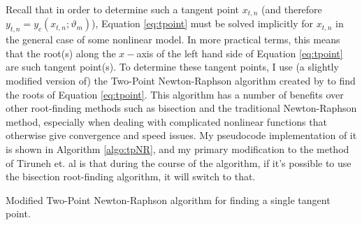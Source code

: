 Recall that in order to determine such a tangent point $x_{t,n}$ (and therefore $y_{t,n}=y_c(x_{t,n};\vartheta_m)$), Equation \eqref{eq:tpoint} must be solved implicitly for $x_{t,n}$ in the general case of some nonlinear model. In more practical terms, this means that the root(s) along the $x-$axis of the left hand side of Equation \eqref{eq:tpoint} are such tangent point(s). To determine these tangent points, I use (a slightly modified version of) the Two-Point Newton-Raphson algorithm created by \textcite{tiruneh2013two} to find the roots of Equation \eqref{eq:tpoint}. This algorithm has a number of benefits over other root-finding methods such as bisection and the traditional Newton-Raphson method, especially when dealing with complicated nonlinear functions that otherwise give convergence and speed issues. My pseudocode implementation of it is shown in Algorithm \ref{algo:tpNR}, and my primary modification to the method of Tiruneh et. al is that during the course of the algorithm, if it's possible to use the bisection root-finding algorithm, it will switch to that.
\begin{algorithm}
\label{algo:tpNR}
\caption{Modified Two-Point Newton-Raphson algorithm for finding a single tangent point.}
\DontPrintSemicolon
\end{algorithm}

